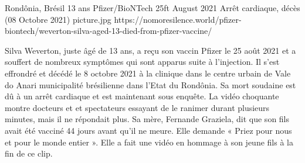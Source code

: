 {Rondônia, Brésil}
{13 ans}
{Pfizer/BioNTech}
{25ft August 2021}
{Arrêt cardiaque, décès (08 Octobre 2021)}
{picture.jpg}
{https://nomoresilence.world/pfizer-biontech/weverton-silva-aged-13-died-from-pfizer-vaccine/}
{

Silva Weverton, juste âgé de 13 ans, a reçu son vaccin Pfizer le 25 août 2021 et
a souffert de nombreux symptômes qui sont apparus suite à l’injection. Il s’est
effrondré et décédé le 8 octobre 2021 à la clinique dans le centre urbain de
Vale do Anari municipalité brésilienne dans l’Etat du Rondônia. Sa mort soudaine
est dû à un arrêt cardiaque et est maintenant sous enquête. La vidéo choquante
montre docteurs et et spectateurs essayant de le ranimer durant plusieurs
minutes, mais il ne répondait plus. Sa mère, Fernande Graziela, dit que son fils
avait été vacciné 44 jours avant qu’il ne meure. Elle demande « Priez pour nous
et pour le monde entier ». Elle a fait une vidéo en hommage à son jeune fils à
la fin de ce clip.

}

